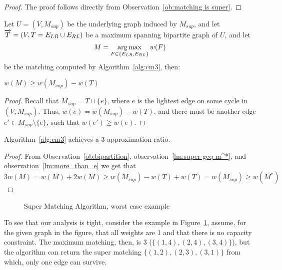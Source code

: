 \begin{proof}
The proof follows directly from Observation~\ref{ob:matching is super}. 
\end{proof}
%
Let $U = (V, M_{sup})$ be the underlying graph induced by $M_{sup}$, 
and let $\overrightarrow{T} = (V, T = E_{LR} \cup E_{RL})$ be a maximum spanning bipartite graph of $U$,
and let 
$$M = \operatorname*{arg\,max}_{F \in \{ E_{LR}, E_{RL} \}}{w(F)}$$
be the matching computed by Algorithm~\ref{alg:cm3}, then:

\begin{observation}
\label{lm:more_than_e}
$w(M) \geq w(M_{sup}) - w(T)$
\end{observation}

\begin{proof}
Recall that $M_{sup} = T \cup \{e\}$, 
where $e$ is the lightest edge on some cycle in $(V, M_{sup})$. 
Thus, $w(e) = w(M_{sup}) - w(T)$, 
and there must be another edge $e' \in M_{sup} \setminus \{e\}$, 
such that $w(e') \geq w(e)$.
\end{proof}

\begin{theorem}
Algorithm~\ref{alg:cm3} achieves a 3-approximation ratio.
\end{theorem}

\begin{proof}
From Observation~\ref{ob:bipartition}, observation~\ref{lm:super-geq-m^*},
and observation~\ref{lm:more_than_e} we get that
$$3w(M) = w(M) + 2w(M) \geq w(M_{sup}) - w(T) + w(T) = w(M_{sup}) \geq w(M^*)$$
\end{proof}

\begin{figure}
\centering

\caption{
\label{fig:3cm-tight-fig}
Super Matching Algorithm, worst case example
}
\end{figure}

To see that our analysis is tight, consider the example in Figure~\ref{fig:3cm-tight-fig},
assume, for the given graph in the figure, 
that all weights are 1 and that there is no capacity constraint.
The maximum matching, then, is 3 ($\{(1,4), (2,4), (3,4)\}$), 
but the algorithm can return the super matching $\{(1,2), (2,3), (3,1)\}$ from which, 
only one edge can survive.  